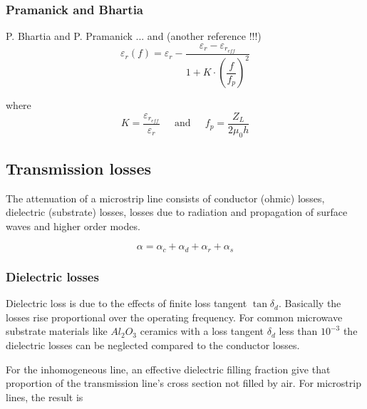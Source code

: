 \documentclass[10pt]{report}
\begin{document}
\subsubsection{Pramanick and Bhartia}

P. Bhartia and P. Pramanick \cite{Pramanick} ... and (another reference !!!)
\begin{equation}
\varepsilon_{r}(f) = \varepsilon_{r} - \dfrac{\varepsilon_{r} - \varepsilon_{r_{eff}}}{1 + K\cdot\left(\dfrac{f}{f_p}\right)^2}
\end{equation}

where
\begin{equation}
K = \dfrac{\varepsilon_{r_{eff}}}{\varepsilon_{r}}
\;\;\;\; \textrm{ and } \;\;\;\;
f_p = \dfrac{Z_L}{2\mu_0 h}
\end{equation}

\subsection{Transmission losses}

The attenuation of a microstrip line consists of conductor (ohmic)
losses, dielectric (substrate) losses, losses due to radiation and
propagation of surface waves and higher order modes.

\begin{equation}
\alpha = \alpha_c + \alpha_d + \alpha_r + \alpha_s
\end{equation}

\subsubsection{Dielectric losses}

Dielectric loss is due to the effects of finite loss tangent
$\tan{\delta_d}$. Basically the losses rise proportional over the
operating frequency.  For common microwave substrate materials like
$Al_2O_3$ ceramics with a loss tangent $\delta_d$ less than $10^{-3}$
the dielectric losses can be neglected compared to the conductor
losses.

\addvspace{12pt}

For the inhomogeneous line, an effective dielectric filling fraction
give that proportion of the transmission line's cross section not
filled by air.  For microstrip lines, the result is
\end{document}
